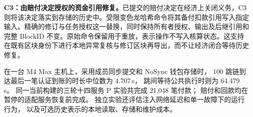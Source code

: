 \noindent\textbf{C3：由赔付决定授权的资金引用修复。}已提交的赔付决定在经济上关闭义务，C3 则将该决定落实到存储的历史中。受限变色龙哈希命令将其备付扣款引用写入指定输入。精确的修订与任务授权这一替换，同时保持所有者授权、输出及后继引用和完整 BlockID 不变。原始命令保留用于重放，表示操作不写入核算状态。这支持在既有区块身份下进行本地异常复核与修订区块再导出，而不让经济闭合等待历史修复。

在一台 M4 Max 主机上，采用成员同步提交和 NoSync 钱包存储时，
100 跳链到达最后一笔认证到账的时长中位数为 4.707\,s，
跳间等待公共执行时则为 64.479\,s。
同一当前构建的三轮十四服务 P 实验共完成 21,048 笔付款；
赔付和回款均在暂停的适配服务恢复前完成。
独立实验还评估注入网络延迟和单一故障下的运行行为，
以及可选历史表示的本地读取、存储和维护成本。
